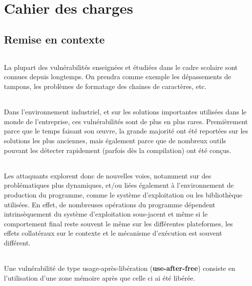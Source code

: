 \chapter{Cahier des charges}
\section{Remise en contexte}
\subparagraph{}
La plupart des vulnérabilités enseignées et étudiées dans le cadre scolaire sont connues depuis longtemps.
On prendra comme exemple les dépassements de tampons, les problèmes de
formatage des chaines de caractères, etc.\subparagraph{}
Dans l'environnement industriel, et sur les solutions importantes utilisées dans le monde
de l'entreprise, ces vulnérabilités sont de plus en plus rares. Premièrement parce que le temps
faisant son œuvre, la grande majorité ont été reportées sur les solutions les plus anciennes,
mais également parce que de nombreux outils pouvant les détecter rapidement (parfois dès la compilation)
ont été conçus.\subparagraph{}
Les attaquants explorent donc de nouvelles voies, notamment sur des problématiques plus dynamiques, et/ou
liées également à l'environnement de production du programme, comme le système d'exploitation ou les bibliothèque utilisées.
En effet, de nombreuses opérations du programme dépendent intrinsèquement du système d'exploitation sous-jacent et
même si le comportement final reste souvent le même sur les différentes plateformes, les effets collatéraux
sur le contexte et le mécanisme d'exécution est souvent différent.\subparagraph{}
Une vulnérabilité de type usage-après-libération (\textbf{use-after-free}) consiste
en l'utilisation d'une zone mémoire après que celle ci ai été libérée.

